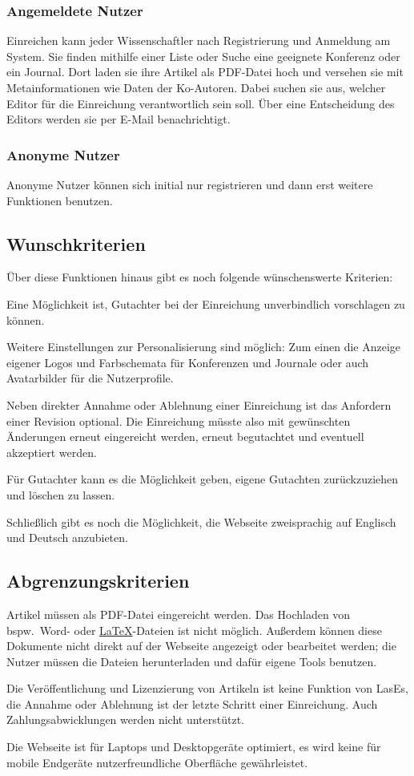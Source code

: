 \subsubsection{Angemeldete Nutzer}\label{mkrit:angemeldet}
Einreichen kann jeder Wissenschaftler nach Registrierung und Anmeldung am System.
Sie finden mithilfe einer Liste oder Suche eine geeignete Konferenz oder ein Journal.
Dort laden sie ihre Artikel als PDF-Datei hoch und versehen sie mit Metainformationen wie Daten der Ko-Autoren.
Dabei suchen sie aus, welcher Editor für die Einreichung verantwortlich sein soll.
Über eine Entscheidung des Editors werden sie per E-Mail benachrichtigt.

\subsubsection{Anonyme Nutzer}\label{mkrit:anon}
Anonyme Nutzer können sich initial nur registrieren und dann erst weitere Funktionen benutzen.


\subsection{Wunschkriterien}

Über diese Funktionen hinaus gibt es noch folgende wünschenswerte Kriterien:

Eine Möglichkeit ist, Gutachter bei der Einreichung unverbindlich vorschlagen zu können.

Weitere Einstellungen zur Personalisierung sind möglich:
Zum einen die Anzeige eigener Logos und Farbschemata für Konferenzen und Journale oder auch Avatarbilder für die Nutzerprofile.

Neben direkter Annahme oder Ablehnung einer Einreichung ist das Anfordern einer Revision optional.
Die Einreichung müsste also mit gewünschten Änderungen erneut eingereicht werden, erneut begutachtet und eventuell akzeptiert werden.

Für Gutachter kann es die Möglichkeit geben, eigene Gutachten zurückzuziehen und löschen zu lassen.

Schließlich gibt es noch die Möglichkeit, die Webseite zweisprachig auf Englisch und Deutsch anzubieten.

\subsection{Abgrenzungskriterien}

Artikel müssen als PDF-Datei eingereicht werden. Das Hochladen von bspw.\ Word- oder \hyperref[glo:latex]{\LaTeX}-Dateien ist nicht möglich.
Außerdem können diese Dokumente nicht direkt auf der Webseite angezeigt oder bearbeitet werden;
die Nutzer müssen die Dateien herunterladen und dafür eigene Tools benutzen.

Die Veröffentlichung und Lizenzierung von Artikeln ist keine Funktion von LasEs,
die Annahme oder Ablehnung ist der letzte Schritt einer Einreichung.
Auch Zahlungsabwicklungen werden nicht unterstützt.

Die Webseite ist für Laptops und Desktopgeräte optimiert, es wird keine für mobile Endgeräte nutzerfreundliche Oberfläche gewährleistet.
